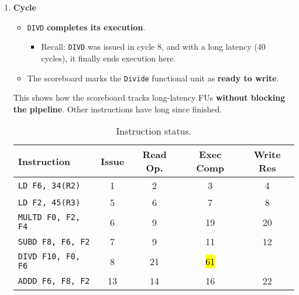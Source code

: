 \begin{enumerate}
    \newpage
    \setcounter{enumi}{60}


    \item \textbf{Cycle \theenumi}
    \begin{itemize}
        \item[\textcolor{Green3}{\faIcon{check}}] \texttt{DIVD} \textbf{completes its execution}.
        \begin{itemize}
            \item Recall: \texttt{DIVD} was issued in cycle 8, and with a long latency (40 cycles), it finally ends execution here.
        \end{itemize}
        \item The scoreboard marks the \texttt{Divide} functional unit as \textbf{ready to write}.
    \end{itemize}
    This shows how the scoreboard tracks long-latency FUs \textbf{without blocking the pipeline}. Other instructions have long since finished.

    \begin{table}[!htp]
        \centering
        \begin{tabular}{@{} l | c c c c @{}}
            \toprule
            Instruction                 & Issue     & Read Op.  & Exec Comp & Write Res \\
            \midrule
            \texttt{LD    F6, 34(R2)}   & 1         & 2         & 3         & 4         \\ [.3em]
            \texttt{LD    F2, 45(R3)}   & 5         & 6         & 7         & 8         \\ [.3em]
            \texttt{MULTD F0, F2, F4}   & 6         & 9         & 19        & 20        \\ [.3em]
            \texttt{SUBD  F8, F6, F2}   & 7         & 9         & 11        & 12        \\ [.3em]
            \texttt{DIVD  F10, F0, F6}  & 8         & 21        & \hl{61}   &           \\ [.3em]
            \texttt{ADDD  F6, F8, F2}   & 13        & 14        & 16        & 22        \\
            \bottomrule
        \end{tabular}
        \caption*{Instruction status.}
    \end{table}


\end{enumerate}
